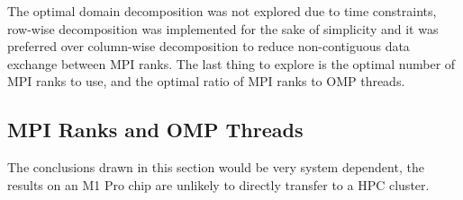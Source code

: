     The optimal domain decomposition was not explored due to time constraints, row-wise decomposition was implemented
    for the sake of simplicity and it was preferred over column-wise decomposition to reduce non-contiguous data
    exchange between MPI ranks.
    The last thing to explore is the optimal number of MPI ranks to use, and the optimal ratio of MPI ranks to OMP threads.

    \subsection{MPI Ranks and OMP Threads}\label{subsec:mpi-omp}
    The conclusions drawn in this section would be very system dependent, the results on an M1 Pro chip are unlikely
    to directly transfer to a HPC cluster.




